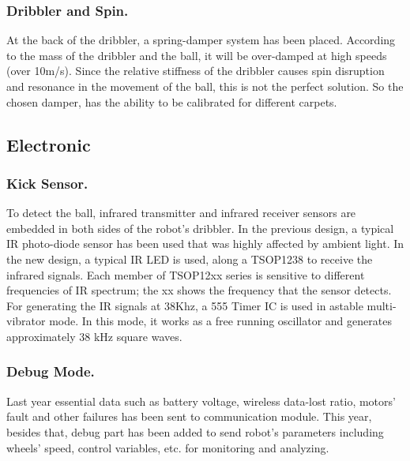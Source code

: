 \documentclass{llncs}
\begin{document}
\subsubsection{Dribbler and Spin.}
\label{subsubsec:DribblerAndSpin}
At the back of the dribbler, a spring-damper system has been placed. According to the mass of the dribbler and the ball, it will be over-damped at high speeds (over 10m/s). Since the relative stiffness of the dribbler causes spin disruption and resonance in the movement of the ball, this is not the perfect solution. So the chosen damper, has the ability to be calibrated for different carpets.

\subsection{Electronic}
\label{subsec:Electronic}
\subsubsection{Kick Sensor.}
\label{subsubsec:KickSensor}
To detect the ball, infrared transmitter and infrared receiver sensors are embedded in both sides of the robot's dribbler.
    In the previous design, a typical IR photo-diode sensor has been used that was highly affected by ambient light. In the new design, a typical IR LED is used, along a TSOP1238 to receive the infrared signals.
    \newline
    Each member of TSOP12xx series is sensitive to different frequencies of IR spectrum; the xx shows the frequency that the sensor detects.
    For generating the IR signals at 38Khz, a 555 Timer IC is used in astable multi-vibrator mode. In this mode, it works as a free running oscillator and generates approximately 38 kHz square waves.
   
\subsubsection{Debug Mode.}
\label{subsubsec:DebugMode}
Last year essential data such as battery voltage, wireless data-lost ratio, motors’ fault and other failures has been sent to communication module. This year, besides that, debug part has been added to send robot's parameters including wheels’ speed, control variables, etc. for monitoring and analyzing.
\end{document}
